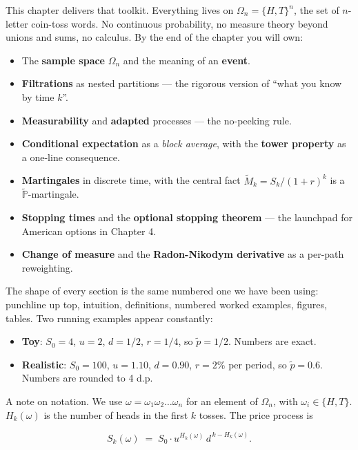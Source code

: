 \documentclass[
  10pt,
  twoside]{book}
\providecommand{\tightlist}{%
  \setlength{\itemsep}{0pt}\setlength{\parskip}{0pt}}
\begin{document}
This chapter delivers that toolkit. Everything lives on
\(\Omega_n = \{H,T\}^n\), the set of \(n\)-letter coin-toss words. No
continuous probability, no measure theory beyond unions and sums, no
calculus. By the end of the chapter you will own:

\begin{itemize}
\tightlist
\item
  The \textbf{sample space} \(\Omega_n\) and the meaning of an
  \textbf{event}.
\item
  \textbf{Filtrations} as nested partitions --- the rigorous version of
  ``what you know by time \(k\)''.
\item
  \textbf{Measurability} and \textbf{adapted} processes --- the
  no-peeking rule.
\item
  \textbf{Conditional expectation} as a \emph{block average}, with the
  \textbf{tower property} as a one-line consequence.
\item
  \textbf{Martingales} in discrete time, with the central fact
  \(\widetilde M_k = S_k/(1+r)^k\) is a
  \(\tilde{\mathbb P}\)-martingale.
\item
  \textbf{Stopping times} and the \textbf{optional stopping theorem} ---
  the launchpad for American options in Chapter 4.
\item
  \textbf{Change of measure} and the \textbf{Radon-Nikodym derivative}
  as a per-path reweighting.
\end{itemize}

The shape of every section is the same numbered one we have been using:
punchline up top, intuition, definitions, numbered worked examples,
figures, tables. Two running examples appear constantly:

\begin{itemize}
\tightlist
\item
  \textbf{Toy}: \(S_0=4\), \(u=2\), \(d=1/2\), \(r=1/4\), so
  \(\tilde p=1/2\). Numbers are exact.
\item
  \textbf{Realistic}: \(S_0=100\), \(u=1.10\), \(d=0.90\), \(r=2\%\) per
  period, so \(\tilde p=0.6\). Numbers are rounded to 4 d.p.
\end{itemize}

A note on notation. We use \(\omega = \omega_1\omega_2\ldots\omega_n\)
for an element of \(\Omega_n\), with \(\omega_i \in \{H,T\}\).
\(H_k(\omega)\) is the number of heads in the first \(k\) tosses. The
price process is

\[S_k(\omega) \;=\; S_0 \cdot u^{H_k(\omega)}\, d^{\,k - H_k(\omega)}.\]
\end{document}
